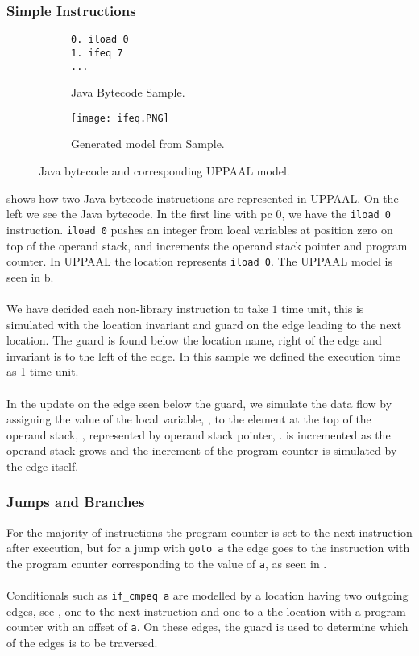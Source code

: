 \subsubsection{Simple Instructions}
\begin{figure}[H]
\centering
\begin{subfigure}{.3\textwidth}
  \begin{lstlisting}[numbers=none]
0. iload 0
1. ifeq 7
...
  \end{lstlisting}
  \caption{Java Bytecode Sample.}
\end{subfigure} 
\hspace{10px}
\begin{subfigure}{.6\textwidth}
  \texttt{[image: ifeq.PNG]}
  \caption{Generated model from Sample.}
\end{subfigure}
\caption{Java bytecode and corresponding UPPAAL model.}
\label{fig:uppaal1}
\end{figure}

 shows how two Java bytecode instructions are represented in UPPAAL. On the left we see the Java bytecode. In the first line with pc 0, we have the \texttt{iload 0} instruction. \texttt{iload 0} pushes an integer from local variables at position zero on top of the operand stack, and increments the operand stack pointer and program counter.
In UPPAAL the location  represents \texttt{iload 0}. The UPPAAL model is seen in b.\\\\
We have decided each non-library instruction to take $1$ time unit, this is simulated with the location invariant  and guard  on the edge leading to the next location. The guard is found below the location name, right of the edge and invariant is to the left of the edge. In this sample we defined the execution time as 1 time unit.\\\\
In the update on the edge seen below the guard, we simulate the data flow by assigning the value of the local variable, , to the element at the top of the operand stack, , represented by operand stack pointer, .  is incremented as the operand stack grows and the increment of the program counter is simulated by the edge itself.

\subsubsection{Jumps and Branches}
For the majority of instructions the program counter is set to the next instruction after execution, but for a jump with \texttt{goto a} the edge goes to the instruction with the program counter corresponding to the value of \texttt{a}, as seen in .\\\\
Conditionals such as \texttt{if\_cmpeq a} are modelled by a location having two outgoing edges, see , one to the next instruction and one to a the location with a program counter with an offset of \texttt{a}. On these edges, the guard is used to determine which of the edges is to be traversed.

